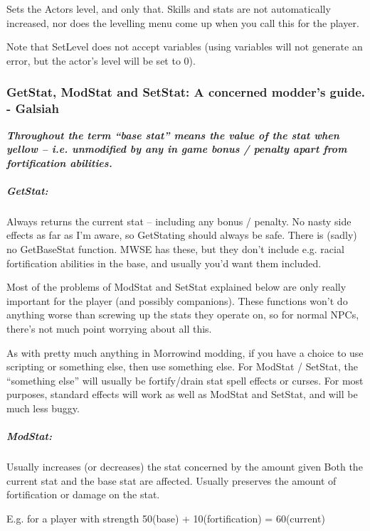 Sets the Actors level, and only that. Skills and stats are not
automatically increased, nor does the levelling menu come up when you
call this for the player.

Note that SetLevel does not accept variables (using variables will not
generate an error, but the actor's level will be set to 0).

\hypertarget{getstat-modstat-and-setstat-a-concerned-modders-guide.---galsiah}{%
\subsubsection{GetStat, ModStat and SetStat: A concerned modder's guide.
-
Galsiah}\label{getstat-modstat-and-setstat-a-concerned-modders-guide.---galsiah}}

\emph{\textbf{Throughout the term ``base stat'' means the value of the
stat when yellow -- i.e. unmodified by any in game bonus / penalty apart
from fortification abilities.}}

\hypertarget{getstat}{%
\subparagraph{GetStat:}\label{getstat}}

Always returns the current stat -- including any bonus / penalty. No
nasty side effects as far as I'm aware, so GetStating should always be
safe. There is (sadly) no GetBaseStat function. MWSE has these, but they
don't include e.g. racial fortification abilities in the base, and
usually you'd want them included.

Most of the problems of ModStat and SetStat explained below are only
really important for the player (and possibly companions). These
functions won't do anything worse than screwing up the stats they
operate on, so for normal NPCs, there's not much point worrying about
all this.

As with pretty much anything in Morrowind modding, if you have a choice
to use scripting or something else, then use something else. For ModStat
/ SetStat, the ``something else'' will usually be fortify/drain stat
spell effects or curses. For most purposes, standard effects will work
as well as ModStat and SetStat, and will be much less buggy.

\hypertarget{modstat}{%
\subparagraph{ModStat:}\label{modstat}}

Usually increases (or decreases) the stat concerned by the amount given
Both the current stat and the base stat are affected. Usually preserves
the amount of fortification or damage on the stat.

E.g. for a player with strength 50(base) + 10(fortification) =
60(current)

